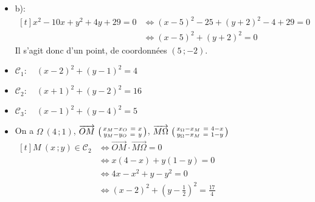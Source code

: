 \documentclass[12pt, a4paper]{article}
\begin{document}
    \begin{Exercise}[number={68}]
        \begin{itemize}
            \item[] b): \quad $\begin{aligned}[t]
                        x^2-10x+y^2+4y+29=0 &\iff (x-5)^2-25+(y+2)^2-4+29=0 &\\
                        &\iff (x-5)^2+(y+2)^2=0 
                    \end{aligned}$ \medbreak Il s'agit donc d'un point, de coordonnées $(5\,;-2)$.
        \end{itemize}
    \end{Exercise}

    \begin{Exercise}[number={69}]
        \begin{itemize}
            \item $\mathcal{C}_1:\quad(x-2)^2+(y-1)^2=4$ 
            \item $\mathcal{C}_2:\quad(x+1)^2+(y-2)^2=16$
            \item $\mathcal{C}_3:\quad(x-1)^2+(y-4)^2=5$
        \end{itemize}
    \end{Exercise}

    \begin{Exercise}[number={70}]
        \begin{itemize}
            \item[] On a $\Omega\ (4\,;1)$, \quad $\overrightarrow{OM}\ \begin{psmallmatrix}x_M-x_O\ =& x \\ y_M-y_O\ =& y\end{psmallmatrix}$, \quad $\overrightarrow{M\Omega}\ \begin{psmallmatrix}x_\Omega-x_M\ =& 4-x\\ y_\Omega-x_M\ =& 1-y\end{psmallmatrix}$ \smallbreak 
            $\begin{aligned}[t]
                M\ (x\,;y)\in\mathcal{C}_2&\iff\overrightarrow{OM}\cdot\overrightarrow{M\Omega}=0 &\\
                &\iff x(4-x)+y(1-y)=0 &\\
                &\iff 4x-x^2+y-y^2=0 &\\
                &\iff (x-2)^2+(y-\tfrac{1}{2})^2=\tfrac{17}{4}
            \end{aligned}$
        \end{itemize}
    \end{Exercise}
\end{document}
